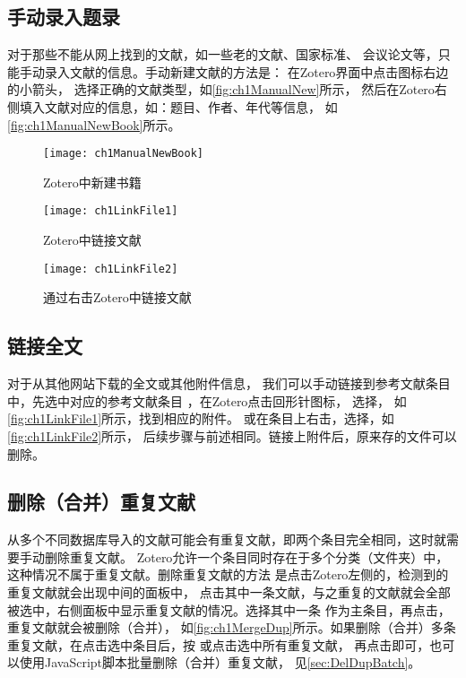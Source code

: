 \documentclass[cn,11pt,chinese]{elegantbook}
\begin{document}
	\subsection{手动录入题录}\label{sec:ManualImport}
	对于那些不能从网上找到的文献，如一些老的文献、国家标准、
	会议论文等，只能手动录入文献的信息。手动新建文献的方法是：
	在Zotero界面中点击\menu{+}图标右边的小箭头，
	选择正确的文献类型，如\autoref{fig:ch1ManualNew}所示，
	然后在Zotero右侧填入文献对应的信息，如：题目、作者、年代等信息，
	如\autoref{fig:ch1ManualNewBook}所示。
			\begin{figure}
					\centering
					\begin{minipage}[t]{\dimexpr0.5\textwidth-4em}
					\centering
					\texttt{[image: ch1ManualNewBook]}
					\caption{Zotero中新建书籍}
					\label{fig:ch1ManualNewBook}
				\end{minipage}	
				\hspace{2cm}
				\begin{minipage}[t]{\dimexpr0.5\textwidth-4em}
					\centering
					\texttt{[image: ch1LinkFile1]}
					\caption{Zotero中链接文献}
					\label{fig:ch1LinkFile1}
				\end{minipage}	
			\end{figure}
			\begin{figure}
				\centering
				\texttt{[image: ch1LinkFile2]}
				\caption{通过右击Zotero中链接文献}
				\label{fig:ch1LinkFile2}
			\end{figure}

		\subsection{链接全文}\label{sec:linkFulltex}
				对于从其他网站下载的全文或其他附件信息，
				我们可以手动链接到参考文献条目中，先选中对应的参考文献条目
				，在Zotero点击回形针图标，
				选择，
				如\autoref{fig:ch1LinkFile1}所示，找到相应的附件。
				或在条目上右击，选择，如\autoref{fig:ch1LinkFile2}所示，
				后续步骤与前述相同。链接上附件后，原来存的文件可以删除。

		\subsection{删除（合并）重复文献}\label{sec:delDup}
				从多个不同数据库导入的文献可能会有重复文献，即两个条目完全相同，这时就需要手动删除重复文献。
				Zotero允许一个条目同时存在于多个分类（文件夹）中，这种情况不属于重复文献。删除重复文献的方法
				是点击Zotero左侧的，检测到的重复文献就会出现中间的面板中，
				点击其中一条文献，与之重复的文献就会全部被选中，右侧面板中显示重复文献的情况。选择其中一条
				作为主条目，再点击，重复文献就会被删除（合并），
				如\autoref{fig:ch1MergeDup}所示。如果删除（合并）多条重复文献，在点击选中条目后，按
				或点击选中所有重复文献，
				再点击即可，也可以使用JavaScript脚本批量删除（合并）重复文献，
				见\cref{sec:DelDupBatch}。
\end{document}
